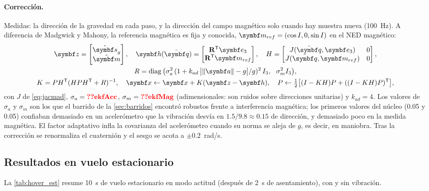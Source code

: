 \paragraph{Corrección.} Medidas: la dirección de la gravedad en cada paso, y
la dirección del campo magnético solo cuando hay muestra nueva (100~Hz). A
diferencia de Madgwick y Mahony, la referencia magnética es fija y conocida,
$\vect m_{ref}=(\cos I,0,\sin I)$ en el NED magnético:
\begin{gather}
\vect z=\begin{bmatrix}\hat{\vect s}_g\\ \hat{\vect m}\end{bmatrix},\quad
\vect h(\bar{\vect q})=\begin{bmatrix}\R\T\eu\\ \R\T\vect m_{ref}\end{bmatrix},\quad
H=\begin{bmatrix}J(\bar{\vect q},\eu) & 0\\ J(\bar{\vect q},\vect m_{ref}) & 0\end{bmatrix},\\
R=\diag\big(\sigma_a^2\,(1+k_{ad}\,\big|\|\vect a\|-g\big|/g)^2\,I_3,\ \ \sigma_m^2I_3\big),\\
K=PH\T(HPH\T+R)^{-1},\quad \vect x\leftarrow\vect x+K(\vect z-\vect h),\quad
P\leftarrow\tfrac12\big[(I-KH)P+((I-KH)P)\T\big],
\end{gather}
con $J$ de \eqref{eq:jacmad}, $\sigma_a=\val{ekfAcc}$, $\sigma_m=\val{ekfMag}$
(adimensionales: son ruidos sobre direcciones unitarias) y $k_{ad}=4$. Los
valores de $\sigma_a$ y $\sigma_m$ son los que el barrido de la
\cref{sec:barridos} encontró robustos frente a interferencia magnética; los
primeros valores del núcleo (0.05 y 0.05) confiaban demasiado en un
acelerómetro que la vibración desvía en $1.5/9.8\approx0.15$ de dirección, y
demasiado poco en la medida magnética. El factor adaptativo infla la covarianza del acelerómetro cuando su norma se
aleja de $g$, es decir, en maniobra. Tras la corrección se renormaliza el
cuaternión y el sesgo se acota a $\pm0.2$~rad/s.

\subsection{Resultados en vuelo estacionario}

La \cref{tab:hover_est} resume 10~s de vuelo estacionario en modo actitud
(después de 2~s de asentamiento), con y sin vibración.

